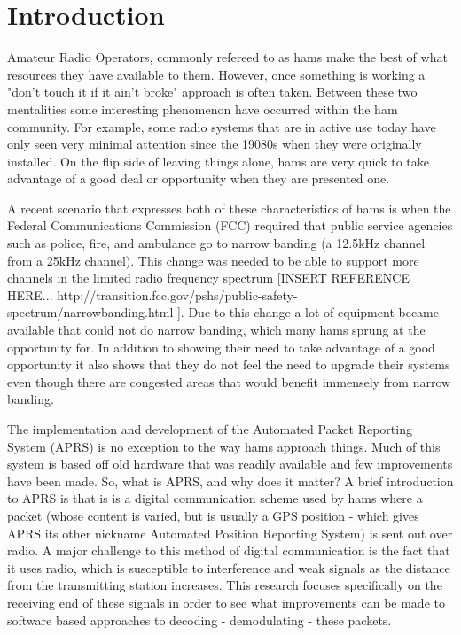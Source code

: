 \chapter{Introduction}

Amateur Radio Operators, commonly refereed to as hams make the best of what resources they have available to them. However, once something is working a "don't touch it if it ain't broke" approach is often taken. Between these two mentalities some interesting phenomenon have occurred within the ham community. For example, some radio systems that are in active use today have only seen very minimal attention since the 19080s when they were originally installed. On the flip side of leaving things alone, hams are very quick to take advantage of a good deal or opportunity when they are presented one.

A recent scenario that expresses both of these characteristics of hams is when the Federal Communications Commission (FCC) required that public service agencies such as police, fire, and ambulance go to narrow banding (a 12.5kHz channel from a 25kHz channel). This change was needed to be able to support more channels in the limited radio frequency spectrum \cite{Commission2012}[INSERT REFERENCE HERE... http://transition.fcc.gov/pshs/public-safety-spectrum/narrowbanding.html ]. Due to this change a lot of equipment became available that could not do narrow banding, which many hams sprung at the opportunity for. In addition to showing their need to take advantage of a good opportunity it also shows that they do not feel the need to upgrade their systems even though there are congested areas that would benefit immensely from narrow banding.

The implementation and development of the Automated Packet Reporting System (APRS) is no exception to the way hams approach things. Much of this system is based off old hardware that was readily available and few improvements have been made. So, what is APRS, and why does it matter? A brief introduction to APRS is that is is a digital communication scheme used by hams where a packet (whose content is varied, but is usually a GPS position - which gives APRS its other nickname Automated Position Reporting System) is sent out over radio. A major challenge to this method of digital communication is the fact that it uses radio, which is susceptible to interference and weak signals as the distance from the transmitting station increases. This research focuses specifically on the receiving end of these signals in order to see what improvements can be made to software based approaches to decoding - demodulating - these packets. 

